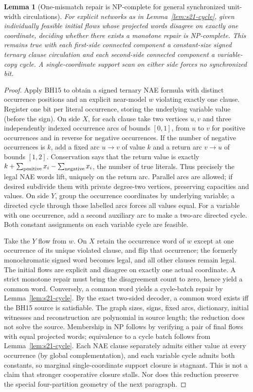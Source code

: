 \documentclass[11pt]{article}
\newtheorem{lemma}[theorem]{Lemma}
\begin{document}
\begin{lemma}[One-mismatch repair is NP-complete for general synchronized unit-width circulations]\label{lem:s21-hard}
For explicit networks as in Lemma~\ref{lem:s21-cycle}, given individually feasible initial flows whose projected words disagree on exactly one coordinate, deciding whether there exists a monotone repair is NP-complete. This remains true with each first-side connected component a constant-size signed ternary clause circulation and each second-side connected component a variable-copy cycle. A single-coordinate support scan on either side forces no synchronized bit.
\end{lemma}
\begin{proof}
Apply BH15 to obtain a signed ternary NAE formula with distinct occurrence positions and an explicit near-model $w$ violating exactly one clause. Register one bit per literal occurrence, storing the underlying variable value (before the sign). On side $X$, for each clause take two vertices $u,v$ and three independently indexed occurrence arcs of bounds $[0,1]$, from $u$ to $v$ for positive occurrences and in reverse for negative occurrences. If the number of negative occurrences is $k$, add a fixed arc $u\to v$ of value $k$ and a return arc $v\to u$ of bounds $[1,2]$. Conservation says that the return value is exactly $k+\sum_{\rm positive}x_i-\sum_{\rm negative}x_i$, the number of true literals. Thus precisely the legal NAE words lift, uniquely on the return arc. Parallel arcs are allowed; if desired subdivide them with private degree-two vertices, preserving capacities and values. On side $Y$, group the occurrence coordinates by underlying variable; a directed cycle through those labelled arcs forces all values equal. For a variable with one occurrence, add a second auxiliary arc to make a two-arc directed cycle. Both constant assignments on each variable cycle are feasible.

Take the $Y$ flow from $w$. On $X$ retain the occurrence word of $w$ except at one occurrence of its unique violated clause, and flip that occurrence; the formerly monochromatic signed word becomes legal, and all other clauses remain legal. The initial flows are explicit and disagree on exactly one actual coordinate. A strict monotone repair must bring the disagreement count to zero, hence yield a common word. Conversely, a common word yields a cycle-batch repair by Lemma~\ref{lem:s21-cycle}. By the exact two-sided decoder, a common word exists iff the BH15 source is satisfiable. The graph sizes, signs, fixed arcs, dictionary, initial witnesses and reconstruction are polynomial in source length; the reduction does not solve the source. Membership in NP follows by verifying a pair of final flows with equal projected words; equivalence to a cycle batch follows from Lemma~\ref{lem:s21-cycle}. Each NAE clause separately admits either value at every occurrence (by global complementation), and each variable cycle admits both constants, so marginal single-coordinate support closure is stagnant. This is not a claim that stronger cooperative closure stalls. Nor does this reduction preserve the special four-partition geometry of the next paragraph.
\end{proof}
\end{document}
